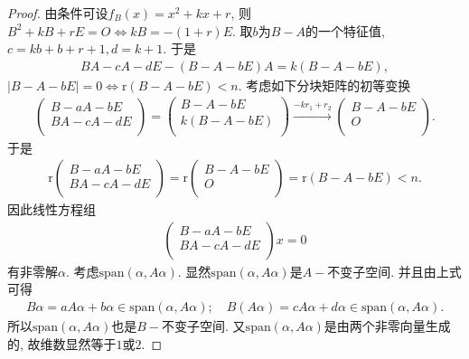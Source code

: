 \documentclass[../../main.tex]{subfiles}
\begin{document}
\begin{proof}
由条件可设$f_B\left( x \right) =x^2+kx+r$, 则
$B^2+kB+rE=O\Longleftrightarrow kB=-\left( 1+r \right) E.$
取$b$为$B-A$的一个特征值, $c=kb+b+r+1,d=k+1$. 于是
\begin{align*}
BA-cA-dE-\left( B-A-bE \right) A=k\left( B-A-bE \right) ,
\end{align*}
$| B-A-bE |=0\Longleftrightarrow \mathrm{r}\left( B-A-bE \right) <n.$
考虑如下分块矩阵的初等变换
\begin{align*}
\left( \begin{array}{c}
B-aA-bE\\
BA-cA-dE\\
\end{array} \right) =\left( \begin{array}{c}
B-A-bE\\
k\left( B-A-bE \right)\\
\end{array} \right) \xrightarrow{-kr_1+r_2}\left( \begin{array}{c}
B-A-bE\\
O\\
\end{array} \right) .
\end{align*}
于是
\begin{align*}
\mathrm{r}\left( \begin{array}{c}
B-aA-bE\\
BA-cA-dE\\
\end{array} \right) =\mathrm{r}\left( \begin{array}{c}
B-A-bE\\
O\\
\end{array} \right) =\mathrm{r}\left( B-A-bE \right) <n.
\end{align*}
因此线性方程组
\begin{align*}
\left( \begin{array}{c}
B-aA-bE\\
BA-cA-dE\\
\end{array} \right) x=0
\end{align*}
有非零解$\alpha$. 考虑$\mathrm{span}\left( \alpha ,A\alpha \right)$. 显然$\mathrm{span}\left( \alpha ,A\alpha \right)$是$A-$不变子空间. 并且由上式可得
\begin{align*}
B\alpha =aA\alpha +b\alpha \in \mathrm{span}\left( \alpha ,A\alpha \right) ;\quad B\left( A\alpha \right) =cA\alpha +d\alpha \in \mathrm{span}\left( \alpha ,A\alpha \right) .
\end{align*}
所以$\mathrm{span}\left( \alpha ,A\alpha \right)$也是$B-$不变子空间. 又$\mathrm{span}\left( \alpha ,A\alpha \right)$是由两个非零向量生成的, 故维数显然等于$1$或$2$.

\end{proof}
\end{document}
